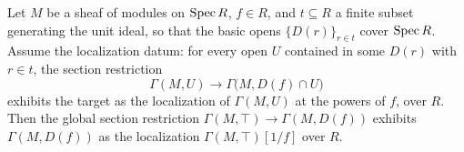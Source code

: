 \begin{lemma}
  \label{mk-lem:section_localization_descent_of_cover}
  \leanok

  Let \(M\) be a sheaf of modules on \(\operatorname{Spec} R\), \(f \in R\), and
  \(t \subseteq R\) a finite subset generating the unit ideal, so that the basic opens
  \(\{D(r)\}_{r \in t}\) cover \(\operatorname{Spec} R\). Assume the localization datum: for every open
  \(U\) contained in some \(D(r)\) with \(r \in t\), the section restriction
  \[
    \Gamma(M, U) \longrightarrow \Gamma\bigl(M, D(f) \cap U\bigr)
  \]
  exhibits the target as the localization of \(\Gamma(M, U)\) at the powers of \(f\),
  over \(R\). Then the global section restriction
  \(\Gamma(M, \top) \to \Gamma(M, D(f))\) exhibits \(\Gamma(M, D(f))\) as the
  localization \(\Gamma(M, \top)[1/f]\) over \(R\).
\end{lemma}
